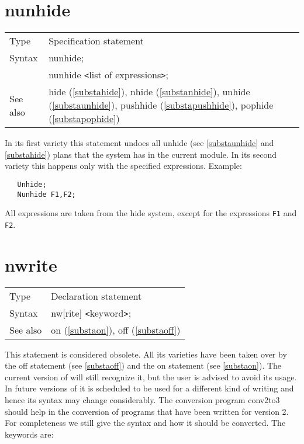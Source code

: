 \vspace{10mm}


\section{nunhide}
\label{substanunhide}

\noindent \begin{tabular}{ll}
Type & Specification statement\\
Syntax & nunhide; \\
       & nunhide {\tt<}list of expressions{\tt>};
\\ See also & hide (\ref{substahide}),
              nhide (\ref{substanhide}),
              unhide (\ref{substaunhide}),
              pushhide (\ref{substapushhide}),
              pophide (\ref{substapophide})
\end{tabular} \vspace{4mm}

\noindent In its first variety this statement undoes all 
unhide (see \ref{substaunhide} and \ref{substahide}) plans 
that the system has in the current module. In its second variety this 
happens only with the specified expressions. Example:
\begin{verbatim}
   Unhide;
   Nunhide F1,F2;
\end{verbatim}
All expressions are taken from the hide system, except for the 
expressions \verb:F1: and \verb:F2:. \vspace{10mm}


\section{nwrite}
\label{substanwrite}

\noindent \begin{tabular}{ll}
Type & Declaration statement\\
Syntax & nw[rite] {\tt<}keyword{\tt>};
\\ See also & on (\ref{substaon}), off (\ref{substaoff})
\end{tabular} \vspace{4mm}

\noindent This statement is considered 
obsolete. All its varieties have been taken over by the 
off statement (see \ref{substaoff}) and the on 
statement (see \ref{substaon}). The current version of {\FORM} will still 
recognize it, but the user is advised to avoid its usage. In future 
versions of {\FORM} it is scheduled to be used for a different kind of 
writing and hence its syntax may change considerably. The conversion 
program conv2to3 should help in the conversion of programs 
that have been written for version 2. For completeness we still give the 
syntax and how it should be converted.
The keywords are: \vspace{4mm}

